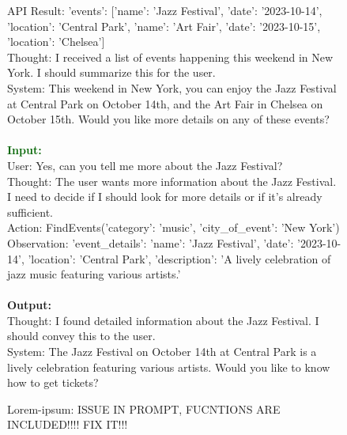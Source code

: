\begin{figure*}[!h]
\begin{tcolorbox}[colback=gray!5!white,colframe=black!95!black,title=\textbf{\small{SGD Instruction Sample} | \textbf{Format:} Response Optimization}]
API Result: {'events': [{'name': 'Jazz Festival', 'date': '2023-10-14', 'location': 'Central Park'}, {'name': 'Art Fair', 'date': '2023-10-15', 'location': 'Chelsea'}]}\\
Thought: I received a list of events happening this weekend in New York. I should summarize this for the user. \\
System: This weekend in New York, you can enjoy the Jazz Festival at Central Park on October 14th, and the Art Fair in Chelsea on October 15th. Would you like more details on any of these events? \\
\\
\small \textcolor{darkgreen}{\textbf{Input:}} \\
User: Yes, can you tell me more about the Jazz Festival? \\
Thought: The user wants more information about the Jazz Festival. I need to decide if I should look for more details or if it's already sufficient. \\
Action: FindEvents({'category': 'music', 'city\_of\_event': 'New York'}) \\
Observation: {'event\_details': {'name': 'Jazz Festival', 'date': '2023-10-14', 'location': 'Central Park', 'description': 'A lively celebration of jazz music featuring various artists.'}} \\
 \\
\small \textcolor{mypurple}{\textbf{Output:}} \\
Thought: I found detailed information about the Jazz Festival. I should convey this to the user. \\
System: The Jazz Festival on October 14th at Central Park is a lively celebration featuring various artists. Would you like to know how to get tickets? \\
\end{tcolorbox}

\vspace{-0.25cm}
\caption{Lorem-ipsum: ISSUE IN PROMPT, FUCNTIONS ARE INCLUDED!!!! FIX IT!!!}
\label{tab:sgd-sft-response}
\end{figure*}
